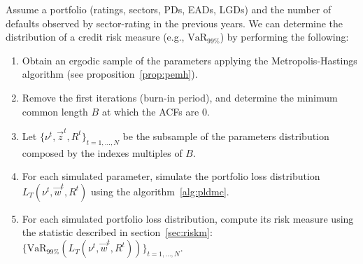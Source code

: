 \documentclass[11pt,fleqn]{book} %
\begin{document}
\begin{algorithm}
	\label{alg:crmd}
	Assume a portfolio (ratings, sectors, PDs, EADs, LGDs) and the number 
	of defaults observed by sector-rating in the previous years. We can
	determine the distribution of a credit risk measure 
	(e.g., $\text{VaR}_{99\%}$) by performing the following:
	\begin{enumerate}
		\item Obtain an ergodic sample of the parameters applying the
		Metropolis-Hastings algorithm (see proposition~\ref{prop:pemh}).
		\item Remove the first iterations (burn-in period), and determine
		the minimum common length $B$ at which the ACFs are $0$.
		\item Let $\{\nu^t, \vec{z}^t, R^t\}_{t=1,\dots,N}$ be the subsample
		of the parameters distribution composed by the indexes multiples 
		of $B$.
		\item For each simulated parameter, simulate the portfolio loss 
		distribution $L_T(\nu^t,\vec{w}^t,R^t)$ using the algorithm~\ref{alg:pldmc}.
		\item For each simulated portfolio loss distribution, compute its 
		risk measure using the statistic described in section~\ref{sec:riskm}:
		$\{\text{VaR}_{99\%}(L_T(\nu^t,\vec{w}^t,R^t))\}_{t=1,\dots,N}$.
	\end{enumerate}
\end{algorithm}
\end{document}
